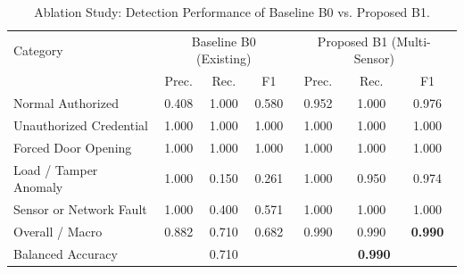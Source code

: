 \begin{table}[!htbp]
\renewcommand{\arraystretch}{1.02}
\centering
\small
\caption{Ablation Study: Detection Performance of Baseline B0 vs. Proposed B1.}
\label{tab:b0_vs_b1}
\vspace{4pt}
\begin{tabular}{l ccc ccc}
\hline
Category & \multicolumn{3}{c}{Baseline B0 (Existing)} & \multicolumn{3}{c}{Proposed B1 (Multi-Sensor)} \\
 & Prec. & Rec. & F1 & Prec. & Rec. & F1 \\
\hline
Normal Authorized & 0.408 & 1.000 & 0.580 & 0.952 & 1.000 & 0.976 \\
Unauthorized Credential & 1.000 & 1.000 & 1.000 & 1.000 & 1.000 & 1.000 \\
Forced Door Opening & 1.000 & 1.000 & 1.000 & 1.000 & 1.000 & 1.000 \\
Load / Tamper Anomaly & 1.000 & 0.150 & 0.261 & 1.000 & 0.950 & 0.974 \\
Sensor or Network Fault & 1.000 & 0.400 & 0.571 & 1.000 & 1.000 & 1.000 \\
\hline
Overall / Macro & 0.882 & 0.710 & 0.682 & 0.990 & 0.990 & \textbf{0.990} \\
\rule{0pt}{2.6ex}Balanced Accuracy & \multicolumn{3}{c}{0.710} & \multicolumn{3}{c}{\textbf{0.990}} \\
\hline
\end{tabular}
\end{table}
